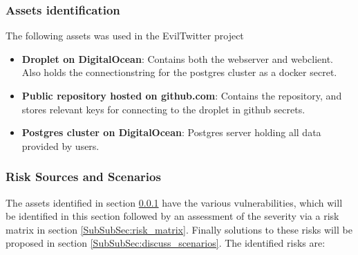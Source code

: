 \documentclass[report/sections/appendix.tex]{subfiles}
\begin{document}
    \label{Sec:security}
            \subsubsection{Assets identification}
            \label{SubSubSec:assets_identification}
                The following assets was used in the EvilTwitter project
            
                \begin{itemize}
                    \item \textbf{Droplet on DigitalOcean}: Contains both the webserver and webclient. Also holds the connectionstring for the postgres cluster as a docker secret.
                    \item \textbf{Public repository hosted on github.com}: Contains the repository, and stores relevant keys for connecting to the droplet in github secrets. 
                    \item \textbf{Postgres cluster on DigitalOcean}: Postgres server holding all data provided by users. 
                \end{itemize}
        
            \subsubsection{Risk Sources and Scenarios}
            \label{SubSubSec:risk_sources_and_scenarios}
                The assets identified in section \ref{SubSubSec:assets_identification} have the various vulnerabilities, which will be identified in this section followed by an assessment of the severity via a risk matrix in section \ref{SubSubSec:risk_matrix}. Finally solutions to these risks will be proposed in section \ref{SubSubSec:discuss_scenarios}. The identified risks are:
            
\end{document}

